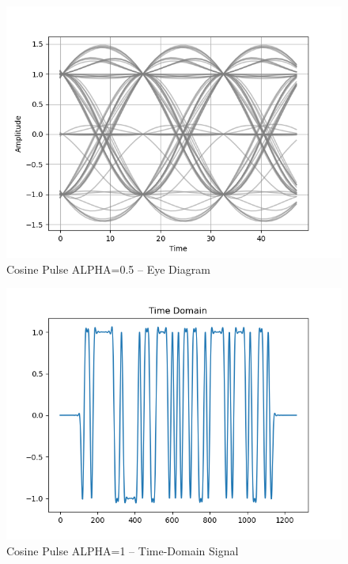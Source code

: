 \documentclass[
	letterpaper, %
	10pt, %
]{CSUniSchoolLabReport}
\begin{document}
\begin{figure}[H] %
	\centering %
	\includegraphics[width=1.2\textwidth]{assignment2i.png} %
	\caption{Cosine Pulse ALPHA=0.5 -- Eye Diagram}
	\label{fig:block}
\end{figure}

\begin{figure}[H] %
	\centering %
	\includegraphics[width=1.2\textwidth]{assignment2j.png} %
	\caption{Cosine Pulse ALPHA=1 -- Time-Domain Signal}
	\label{fig:block}
\end{figure}
\end{document}
